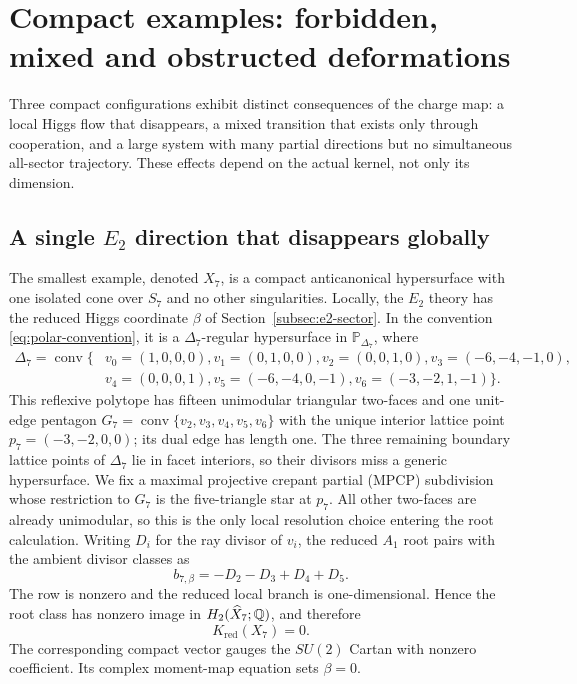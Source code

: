 \section{Compact examples: forbidden, mixed and obstructed deformations}
\label{sec:examples}

Three compact configurations exhibit distinct consequences of the charge
map: a local Higgs flow that disappears, a mixed transition that exists only
through cooperation, and a large system with many partial directions but no
simultaneous all-sector trajectory. These effects depend on the actual kernel,
not only its dimension.

\subsection[A single E2 direction that disappears globally]{A single $E_2$ direction that disappears globally}
\label{subsec:x7}

The smallest example, denoted $X_7$, is a compact anticanonical hypersurface
with one isolated cone over $S_7$ and no other singularities. Locally, the
$E_2$ theory has the reduced Higgs coordinate $\beta$ of
Section~\ref{subsec:e2-sector}. In the convention
\eqref{eq:polar-convention}, it is a $\Delta_7$-regular hypersurface in
$\mathbb P_{\Delta_7}$, where
\begin{equation}
\begin{split}
 \Delta_7=\operatorname{conv}\{&v_0=(1,0,0,0),v_1=(0,1,0,0),
 v_2=(0,0,1,0),v_3=(-6,-4,-1,0),\\
 &v_4=(0,0,0,1),v_5=(-6,-4,0,-1),
 v_6=(-3,-2,1,-1)\}.
\end{split}
 \label{eq:x7-polytope}
\end{equation}
This reflexive polytope has fifteen unimodular triangular two-faces and one
unit-edge pentagon
$G_7=\operatorname{conv}\{v_2,v_3,v_4,v_5,v_6\}$ with the unique interior
lattice point $p_7=(-3,-2,0,0)$; its dual edge has length one. The three
remaining boundary lattice points of $\Delta_7$ lie in facet interiors, so
their divisors miss a generic hypersurface. We fix a
maximal projective crepant partial (MPCP) subdivision whose restriction to
$G_7$ is the five-triangle star at
$p_7$. All other two-faces are already unimodular, so this is the only local
resolution choice entering the root calculation. Writing $D_i$ for the ray
divisor of $v_i$, the reduced $A_1$ root pairs with the ambient divisor
classes as
\begin{equation}
 b_{7,\beta}=-D_2-D_3+D_4+D_5.
 \label{eq:x7-root-row}
\end{equation}
The row is nonzero and the reduced local branch is one-dimensional. Hence
the root class has nonzero image in $H_2(\widehat X_7;\mathbb Q)$, and therefore
\begin{equation}
 K_{\mathrm{red}}(X_7)=0.
 \label{eq:x7-kernel}
\end{equation}
The corresponding compact vector gauges the $SU(2)$ Cartan with nonzero
coefficient. Its complex moment-map equation sets $\beta=0$.

